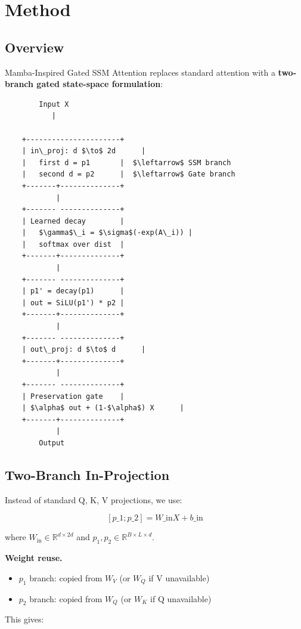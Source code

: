 \section{Method}

\subsection{Overview}

Mamba-Inspired Gated SSM Attention replaces standard attention with a 
\textbf{two-branch gated state-space formulation}:

\begin{lstlisting}
        Input X
           |
            
    +----------------------+
    | in\_proj: d $\to$ 2d      |
    |   first d = p1       |  $\leftarrow$ SSM branch
    |   second d = p2      |  $\leftarrow$ Gate branch
    +-------+--------------+
            |
    +------- --------------+
    | Learned decay        |
    |   $\gamma$\_i = $\sigma$(-exp(A\_i)) |
    |   softmax over dist  |
    +-------+--------------+
            |
    +------- --------------+
    | p1' = decay(p1)      |
    | out = SiLU(p1') * p2 |
    +-------+--------------+
            |
    +------- --------------+
    | out\_proj: d $\to$ d      |
    +-------+--------------+
            |
    +------- --------------+
    | Preservation gate    |
    | $\alpha$ out + (1-$\alpha$) X      |
    +-------+--------------+
            |
        Output
\end{lstlisting}

\subsection{Two-Branch In-Projection}

Instead of standard Q, K, V projections, we use:

\[
[p\_1; p\_2] = W\_\text{in} X + b\_\text{in}
\tag{4.1}
\]

where $W_\text{in} \in \mathbb{R}^{d \times 2d}$ and $p_1, p_2 \in \mathbb{R}^{B \times L \times d}$.

\textbf{Weight reuse.}

\begin{itemize}
\item $p_1$ branch: copied from $W_V$ (or $W_Q$ if V unavailable)
\item $p_2$ branch: copied from $W_Q$ (or $W_K$ if Q unavailable)

\end{itemize}
This gives:

